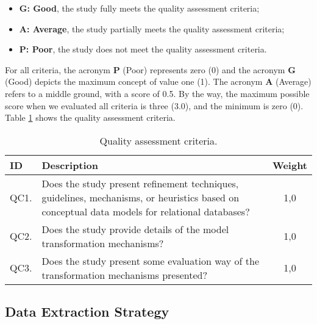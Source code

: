 \begin{itemize}
    \item \textbf{G: Good}, the study fully meets the quality assessment criteria;
    \item \textbf{A: Average}, the study partially meets the quality assessment criteria;
    \item \textbf{P: Poor}, the study does not meet the quality assessment criteria.
\end{itemize}

For all criteria, the acronym \textbf{P} (Poor) represents zero (0) and the acronym \textbf{G} (Good) depicts the maximum concept of value one (1).
The acronym \textbf{A} (Average) refers to a middle ground, with a score of 0.5.
By the way, the maximum possible score when we evaluated all criteria is three (3.0), and the minimum is zero (0).
Table \ref{tab:QAC} shows the quality assessment criteria.

\begin{table}[!htb]
    \centering
    \footnotesize
    \caption{Quality assessment criteria.}
    \label{tab:QAC}
    \begin{tabular}{l|p{12cm}|c}
    \bottomrule
    \rowcolor[HTML]{C0C0C0}
    \textbf{ID} & \textbf{Description} & \textbf{Weight} 
    \\ 
    \hline
    QC1. & Does the study present refinement techniques, guidelines, mechanisms, or heuristics based on conceptual data models for relational databases? & 1,0 
    \\
    QC2. & Does the study provide details of the model transformation mechanisms? & 1,0 
    \\
    QC3. & Does the study present some evaluation way of the transformation mechanisms presented? & 1,0 
    \\
    \toprule
    \end{tabular}
\end{table}

\subsection{Data Extraction Strategy} \label{ssec_slm:dataExtraction}

